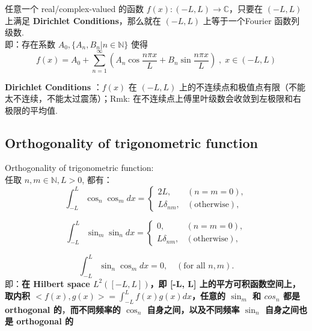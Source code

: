 \documentclass[12pt]{article}
\begin{document}
\begin{theorem}
    任意一个 real/complex-valued 的函数 $f(x): (-L, L) \rightarrow \mathbb{C}$，只要在 $(-L, L)$ 上满足 \textbf{Dirichlet Conditions}，那么就在 $(-L, L)$ 上等于一个Fourier 函数列级数.\\
    即：存在系数 $A_0, \{A_n, B_n | n \in \mathbb{N}\}$ 使得 
     $$
    f(x) = A_0 + \sum_{n = 1} ^ \infty (A_n \cos \frac{n \pi x}{L} + B_n \sin \frac{n \pi x}{L})\; , \; x \in (-L, L)
    $$

    \textbf{Dirichlet Conditions} ：$f(x)$ 在 $(-L,L)$ 上的不连续点和极值点有限（不能太不连续，不能太过震荡）；Rmk: 在不连续点上傅里叶级数会收敛到左极限和右极限的平均值.
 \end{theorem}



\subsection{Orthogonality of trigonometric function}
\begin{theorem}
    Orthogonality of trigonometric function:\\
    任取 $n,m \in \mathbb{N}, L > 0$, 都有：
    \[
\int_{-L}^{L} \cos_n \cos_m dx = 
\begin{cases} 
2L, & (n = m = 0), \\ 
L \delta_{nm}, & (\text{otherwise}),
\end{cases}
\]

\[
\int_{-L}^{L} \sin_m \sin_n  dx = 
\begin{cases} 
0, & (n = m = 0), \\ 
L \delta_{nm}, & (\text{otherwise}),
\end{cases}
\]

\[
\int_{-L}^{L} \sin_n \cos_m dx = 0, \quad (\text{for all } n, m).
\]
即：\textbf{在 Hilbert space $L^2([-L, L])$，即 [-L, L] 上的平方可积函数空间上，取内积 $<f(x), g(x)> = \int_{-L}^L f(x)g(x)dx$，任意的 $\sin_m$ 和 $cos_n$ 都是 orthogonal 的}，\textbf{而不同频率的 $\cos_n$ 自身之间，以及不同频率 $\sin_n$ 自身之间也是 orthogonal 的}
\end{theorem}
\end{document}

